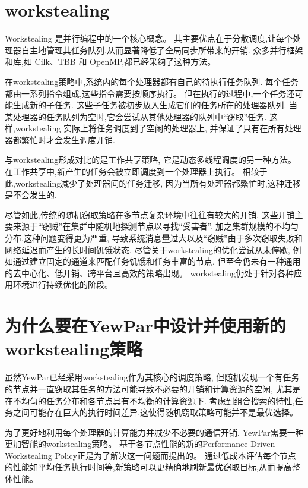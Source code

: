 \documentclass{mproj}
\begin{document}
\section{workstealing}
Workstealing 是并行编程中的一个核心概念。
其主要优点在于分散调度,让每个处理器自主地管理其任务队列,从而显著降低了全局同步所带来的开销.
众多并行框架和库,如 Cilk、TBB 和 OpenMP,都已经采纳了这种方法。

在workstealing策略中,系统内的每个处理器都有自己的待执行任务队列.
每个任务都由一系列指令组成,这些指令需要按顺序执行。
但在执行的过程中,一个任务还可能生成新的子任务.
这些子任务被初步放入生成它们的任务所在的处理器队列.
当某处理器的任务队列为空时,它会尝试从其他处理器的队列中“窃取”任务.
这样,workstealing 实际上将任务调度到了空闲的处理器上,
并保证了只有在所有处理器都繁忙时才会发生调度开销.\cite{10.1145/1248377.1248396}

与workstealing形成对比的是工作共享策略,
它是动态多线程调度的另一种方法。
在工作共享中,新产生的任务会被立即调度到一个处理器上执行。
相较于此,workstealing减少了处理器间的任务迁移,
因为当所有处理器都繁忙时,这种迁移是不会发生的.\cite{10.1145/324133.324234}

尽管如此,传统的随机窃取策略在多节点复杂环境中往往有较大的开销.
这些开销主要来源于“窃贼”在集群中随机地探测节点以寻找“受害者”.
加之集群规模的不均匀分布,这种问题变得更为严重,
导致系统消息量过大以及“窃贼”由于多次窃取失败和网络延迟而产生的长时间饥饿状态.
尽管关于workstealing的优化尝试从未停歇,
例如通过建立固定的通道来匹配任务饥饿和任务丰富的节点\cite{10.1145/2851141.2851175},
但至今仍未有一种通用的去中心化、低开销、跨平台且高效的策略出现。
workstealing仍处于针对各种应用环境进行持续优化的阶段。

\section{为什么要在YewPar中设计并使用新的workstealing策略}

虽然YewPar已经采用workstealing作为其核心的调度策略,
但随机发现一个有任务的节点并一直窃取其任务的方法可能导致不必要的开销和计算资源的空闲,
尤其是在不均匀的任务分布和各节点具有不均衡的计算资源下.
考虑到组合搜索的特性,任务之间可能存在巨大的执行时间差异,这使得随机窃取策略可能并不是最优选择。

为了更好地利用每个处理器的计算能力并减少不必要的通信开销,
YewPar需要一种更加智能的workstealing策略。
基于各节点性能的新的Performance-Driven Workstealing Policy正是为了解决这一问题而提出的。
通过低成本评估每个节点的性能如平均任务执行时间等,新策略可以更精确地刷新最优窃取目标,从而提高整体性能。
\end{document}
